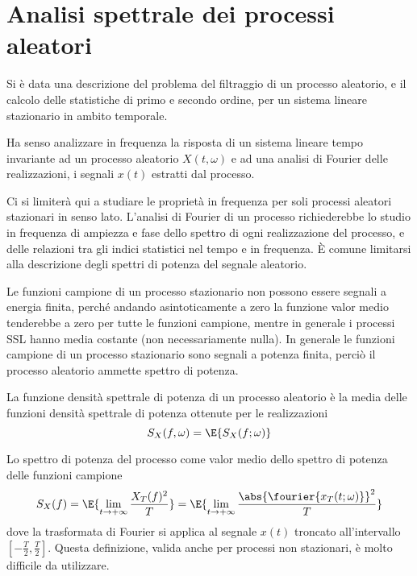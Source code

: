 \chapter{Analisi spettrale dei processi aleatori}
\label{ch:teoriasegnali-capitolo7}
Si è data una descrizione del problema del filtraggio di un processo aleatorio, e il calcolo delle statistiche di primo e secondo ordine, per un sistema lineare stazionario in ambito temporale.

Ha senso analizzare in frequenza la risposta di un sistema lineare tempo invariante ad un processo aleatorio $X(t,\omega)$ e ad una analisi di Fourier delle realizzazioni, i segnali $x(t)$ estratti dal processo.

Ci si limiterà qui a studiare le proprietà in frequenza per soli processi aleatori stazionari in senso lato. L'analisi di Fourier di un processo richiederebbe lo studio in frequenza di ampiezza e fase dello spettro di ogni realizzazione del processo, e delle relazioni tra gli indici statistici nel tempo e in frequenza.
\`{E} comune limitarsi alla descrizione degli spettri di potenza del segnale aleatorio.

Le funzioni campione di un processo stazionario non possono essere segnali a energia finita, perché andando asintoticamente a zero la funzione valor medio tenderebbe a zero per tutte le funzioni campione, mentre in generale i processi SSL hanno media costante (non necessariamente nulla).
In generale le funzioni campione di un processo stazionario sono segnali a potenza finita, perciò il processo aleatorio ammette spettro di potenza.

La funzione densità spettrale di potenza di un processo aleatorio è la media delle funzioni densità spettrale di potenza ottenute per le realizzazioni
\begin{equation}
	S_X(f,\omega)=\E{S_X(f;\omega)}
\end{equation}

Lo spettro di potenza del processo come valor medio dello spettro di potenza delle funzioni campione
\begin{equation}
\label{eq:densita_spettrale_processo_aleatorio}
	S_X(f)=\E{\lim\limits_{t\to+\infty}\frac{X_T(f)^2}{T}}=\E{\lim\limits_{t\to+\infty}\frac{\abs{\fourier{x_T(t;\omega)}}^2}{T}}
\end{equation}
dove la trasformata di Fourier si applica al segnale $x(t)$ troncato all'intervallo $[-\frac{T}{2},\frac{T}{2}]$.
Questa definizione, valida anche per processi non stazionari, è molto difficile da utilizzare.

